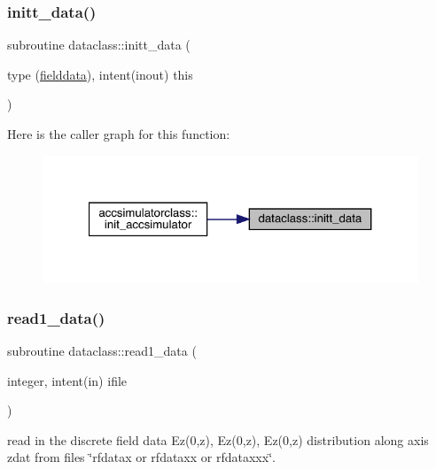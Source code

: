 \mbox{\label{namespacedataclass_a97d261734f3a864b94d895a3d2ac2317}} 
\subsubsection{\texorpdfstring{initt\_data()}{initt\_data()}}
{\footnotesize\ttfamily subroutine dataclass\+::initt\+\_\+data (\begin{DoxyParamCaption}\item[{type (\mbox{\hyperlink{namespacedataclass_structdataclass_1_1fielddata}{fielddata}}), intent(inout)}]{this }\end{DoxyParamCaption})}

Here is the caller graph for this function\+:\nopagebreak
\begin{figure}[H]
\begin{center}
\leavevmode
\includegraphics[width=321pt]{namespacedataclass_a97d261734f3a864b94d895a3d2ac2317_icgraph}
\end{center}
\end{figure}
\mbox{\label{namespacedataclass_a6733af7e3067d69140c61e2b4580a70b}} 
\subsubsection{\texorpdfstring{read1\_data()}{read1\_data()}}
{\footnotesize\ttfamily subroutine dataclass\+::read1\+\_\+data (\begin{DoxyParamCaption}\item[{integer, intent(in)}]{ifile }\end{DoxyParamCaption})}



read in the discrete field data Ez(0,z), Ez\textquotesingle{}(0,z), Ez\textquotesingle{}\textquotesingle{}(0,z) distribution along axis zdat from files \char`\"{}rfdatax or rfdataxx 
 or rfdataxxx\char`\"{}. 

